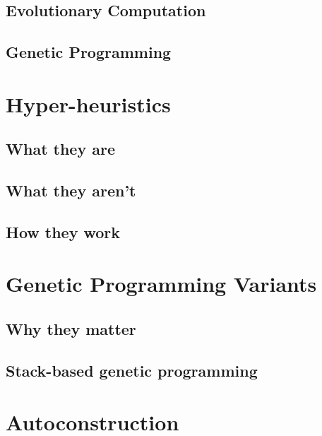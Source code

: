 \documentclass{beamer}
\begin{document}
\subsection{Evolutionary Computation}


\subsection{Genetic Programming}


\section[Hyper-heuristics]{Hyper-heuristics}

\subsection{What they are}
\subsection{What they aren't}
\subsection{How they work}


\section[GP Variants]{Genetic Programming Variants}
\subsection{Why they matter}
\subsection{Stack-based genetic programming}

\section[Autoconstruction]{Autoconstruction}
\end{document}
